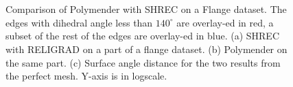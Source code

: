 \begin{figure}[tb]
	\centering
		\\
		\\
		\caption{Comparison of Polymender with SHREC on a Flange dataset. The edges with dihedral angle less than $140^\circ$ are overlay-ed in red, a subset of the rest of the edges are overlay-ed in blue. (a) SHREC with RELIGRAD on a part of a flange dataset. (b) Polymender on the same part. (c) Surface angle distance for the two results from the perfect mesh. Y-axis is in logscale. }	
\end{figure}
